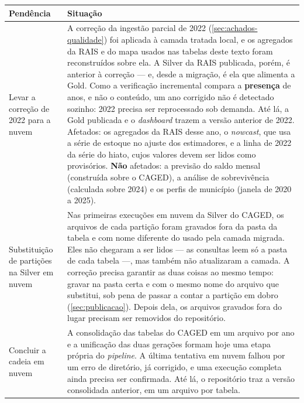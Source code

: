 \begin{quadro}[htbp]
    \centering
    \caption{Pendências para a versão final}
    \label{quadro:pendencias}
    \footnotesize
    \renewcommand{\arraystretch}{1.3}
    \begin{tabularx}{\textwidth}{%
        >{\raggedright\arraybackslash\hsize=0.62\hsize}X
        >{\raggedright\arraybackslash\hsize=1.38\hsize}X}
        \toprule
        \rowcolor{black!8}
        \textbf{Pendência} & \textbf{Situação} \\
        \midrule
        Levar a correção de 2022 para a nuvem &
        A correção da ingestão parcial de 2022 (\autoref{sec:achados-qualidade}) foi aplicada à camada tratada local, e os agregados da RAIS e do mapa usados nas tabelas deste texto foram reconstruídos sobre ela. A Silver da RAIS publicada, porém, é anterior à correção --- e, desde a migração, é ela que alimenta a Gold. Como a verificação incremental compara a \textbf{presença} de anos, e não o conteúdo, um ano corrigido não é detectado sozinho: 2022 precisa ser reprocessado sob demanda. Até lá, a Gold publicada e o \textit{dashboard} trazem a versão anterior de 2022. Afetados: os agregados da RAIS desse ano, o \textit{nowcast}, que usa a série de estoque no ajuste dos estimadores, e a linha de 2022 da série do hiato, cujos valores devem ser lidos como provisórios. \textbf{Não} afetados: a previsão do saldo mensal (construída sobre o CAGED), a análise de sobrevivência (calculada sobre 2024) e os perfis de município (janela de 2020 a 2025). \\
        Substituição de partições na Silver em nuvem &
        Nas primeiras execuções em nuvem da Silver do CAGED, os arquivos de cada partição foram gravados fora da pasta da tabela e com nome diferente do usado pela camada migrada. Eles não chegaram a ser lidos --- as consultas leem só a pasta de cada tabela ---, mas também não atualizaram a camada. A correção precisa garantir as duas coisas ao mesmo tempo: gravar na pasta certa e com o mesmo nome do arquivo que substitui, sob pena de passar a contar a partição em dobro (\autoref{sec:publicacao}). Depois dela, os arquivos gravados fora do lugar precisam ser removidos do repositório. \\
        Concluir a cadeia em nuvem &
        A consolidação das tabelas do CAGED em um arquivo por ano e a unificação das duas gerações formam hoje uma etapa própria do \textit{pipeline}. A última tentativa em nuvem falhou por um erro de diretório, já corrigido, e uma execução completa ainda precisa ser confirmada. Até lá, o repositório traz a versão consolidada anterior, em um arquivo por tabela. \\

\end{tabularx}
\end{quadro}
